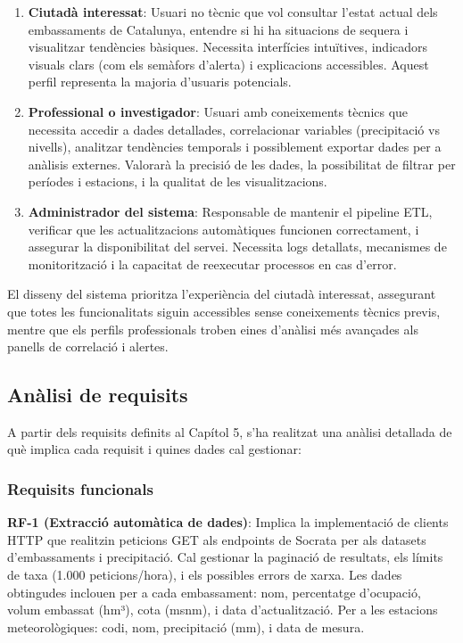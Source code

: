 \begin{enumerate}
    \item \textbf{Ciutadà interessat}: Usuari no tècnic que vol consultar l'estat actual dels embassaments de Catalunya, entendre si hi ha situacions de sequera i visualitzar tendències bàsiques. Necessita interfícies intuïtives, indicadors visuals clars (com els semàfors d'alerta) i explicacions accessibles. Aquest perfil representa la majoria d'usuaris potencials.
    
    \item \textbf{Professional o investigador}: Usuari amb coneixements tècnics que necessita accedir a dades detallades, correlacionar variables (precipitació vs nivells), analitzar tendències temporals i possiblement exportar dades per a anàlisis externes. Valorarà la precisió de les dades, la possibilitat de filtrar per períodes i estacions, i la qualitat de les visualitzacions.
    
    \item \textbf{Administrador del sistema}: Responsable de mantenir el pipeline ETL, verificar que les actualitzacions automàtiques funcionen correctament, i assegurar la disponibilitat del servei. Necessita logs detallats, mecanismes de monitorització i la capacitat de reexecutar processos en cas d'error.
\end{enumerate}

El disseny del sistema prioritza l'experiència del ciutadà interessat, assegurant que totes les funcionalitats siguin accessibles sense coneixements tècnics previs, mentre que els perfils professionals troben eines d'anàlisi més avançades als panells de correlació i alertes.


\subsection{Anàlisi de requisits}

A partir dels requisits definits al Capítol 5, s'ha realitzat una anàlisi detallada de què implica cada requisit i quines dades cal gestionar:

\subsubsection{Requisits funcionals}

\textbf{RF-1 (Extracció automàtica de dades)}: Implica la implementació de clients HTTP que realitzin peticions GET als endpoints de Socrata per als datasets d'embassaments i precipitació. Cal gestionar la paginació de resultats, els límits de taxa (1.000 peticions/hora), i els possibles errors de xarxa. Les dades obtingudes inclouen per a cada embassament: nom, percentatge d'ocupació, volum embassat (hm³), cota (msnm), i data d'actualització. Per a les estacions meteorològiques: codi, nom, precipitació (mm), i data de mesura.

